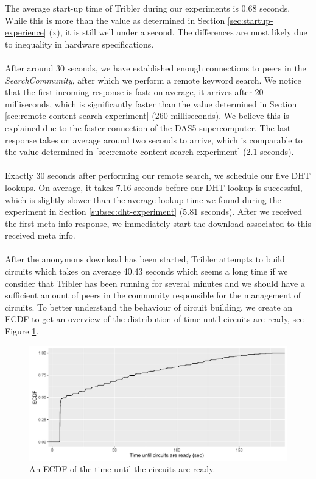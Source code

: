The average start-up time of Tribler during our experiments is 0.68 seconds. While this is more than the value as determined in Section \ref{sec:startup-experience} (x), it is still well under a second. The differences are most likely due to inequality in hardware specifications.\\\\
After around 30 seconds, we have established enough connections to peers in the \emph{SearchCommunity}, after which we perform a remote keyword search. We notice that the first incoming response is fast: on average, it arrives after 20 milliseconds, which is significantly faster than the value determined in Section \ref{sec:remote-content-search-experiment} (260 milliseconds). We believe this is explained due to the faster connection of the DAS5 supercomputer. The last response takes on average around two seconds to arrive, which is comparable to the value determined in \ref{sec:remote-content-search-experiment} (2.1 seconds).\\\\
Exactly 30 seconds after performing our remote search, we schedule our five DHT lookups. On average, it takes 7.16 seconds before our DHT lookup is successful, which is slightly slower than the average lookup time we found during the experiment in Section \ref{subsec:dht-experiment} (5.81 seconds). After we received the first meta info response, we immediately start the download associated to this received meta info.\\\\
After the anonymous download has been started, Tribler attempts to build circuits which takes on average 40.43 seconds which seems a long time if we consider that Tribler has been running for several minutes and we should have a sufficient amount of peers in the community responsible for the management of circuits. To better understand the behaviour of circuit building, we create an ECDF to get an overview of the distribution of time until circuits are ready, see Figure \ref{fig:big-experiment-circuits}.

\begin{figure}[!h]
	\centering
	\includegraphics[width=1.0\columnwidth]{images/big_experiment/circuits_ecdf}
	\caption{An ECDF of the time until the circuits are ready.}
	\label{fig:big-experiment-circuits}
\end{figure}

